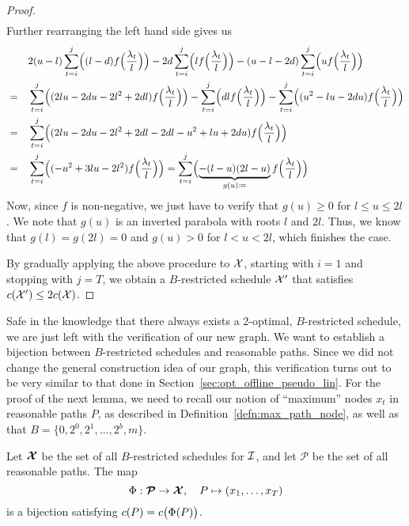 \begin{proof}
\begin{align*}
\end{align*}
Further rearranging the left hand side gives us
\begin{align*}
	&&&2(u-l)\sum\limits_{t=i}^j\Bigl((l-d)f\Bigl(\frac{\lambda_t}{l}\Bigr)\Bigr)-2d\sum\limits_{t=i}^j\Bigl(lf\Bigl(\frac{\lambda_t}{l}\Bigr)\Bigr)-(u-l-2d)\sum\limits_{t=i}^j\Bigl(uf\Bigl(\frac{\lambda_t}{l}\Bigr)\Bigr)\\
	&=&&\sum\limits_{t=i}^j\Bigl((2lu-2du-2l^2+2dl)f\Bigl(\frac{\lambda_t}{l}\Bigr)\Bigr)-\sum\limits_{t=i}^j\Bigl(dlf\Bigl(\frac{\lambda_t}{l}\Bigr)\Bigr)-\sum\limits_{t=i}^j\Bigl((u^2-lu-2du)f\Bigl(\frac{\lambda_t}{l}\Bigr)\Bigr)\\
	&=&&\sum\limits_{t=i}^j\Bigl((2lu-2du-2l^2+2dl-2dl-u^2+lu+2du)f\Bigl(\frac{\lambda_t}{l}\Bigr)\Bigr)\\
	&=&&\sum\limits_{t=i}^j\Bigl((-u^2+3lu-2l^2)f\Bigl(\frac{\lambda_t}{l}\Bigr)\Bigr)=\sum\limits_{t=i}^j\Bigl(\underbrace{-(l-u)(2l-u)}_{g(u)\coloneqq}f\Bigl(\frac{\lambda_t}{l}\Bigr)\Bigr) 
\end{align*}
Now, since $f$ is non-negative, we just have to verify that $g(u)\ge0$ for $l\le u\le 2l$. We note that $g(u)$ is an inverted parabola with roots $l$ and $2l$. Thus, we know that $g(l)=g(2l)=0$ and $g(u)>0$ for $l<u<2l$, which finishes the case.

By gradually applying the above procedure to $\mathcal{X}$, starting with $i=1$ and stopping with $j=T$, we obtain a $B$-restricted schedule $\mathcal{X}'$ that satisfies $c(\mathcal{X}')\le2c(\mathcal{X})$.
\end{proof}
Safe in the knowledge that there always exists a 2-optimal, $B$-restricted schedule, we are just left with the verification of our new graph. We want to establish a bijection between $B$-restricted schedules and reasonable paths. Since we did not change the general construction idea of our graph, this verification turns out to be very similar to that done in Section~\ref{sec:opt_offline_pseudo_lin}. For the proof of the next lemma, we need to recall our notion of ``maximum'' nodes $x_t$ in reasonable paths $P$, as described in Definition~\ref{defn:max_path_node}, as well as that $B=\{0,2^0,2^1,\dotsc,2^b,m\}$.
\begin{lem}\label{lem:sched_reasn_path_approx_2}
Let $\bm{\mathcal{X}}$ be the set of all $B$-restricted schedules for $\mathcal{I}$, and let $\bm{\mathcal{P}}$ be the set of all reasonable paths. The map
\begin{equation*}
	\Phi:\bm{\mathcal{P}}\rightarrow\bm{\mathcal{X}},\quad P\mapsto (x_1,\dotsc,x_T)
\end{equation*}
is a bijection satisfying $c(P)=c\bigl(\Phi(P)\bigr)$.
\end{lem}
